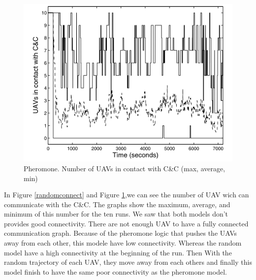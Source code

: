\begin{figure}[h]
\caption{\label{pheromoneconnect}Pheromone. Number of UAVs in contact with C\&C (max, average, min)}
   \includegraphics{../images/pheromone_resultat_connectivite.png}
\end{figure}
In Figure \ref{randomconnect} and Figure \ref{pheromoneconnect},we can see the number of UAV wich can communicate with the C\&C.  The  graphs  show the maximum, average, and minimum of this number for the ten runs.
We saw that both models don't provides good connectivity. There are not enough UAV to have a fully connected communication graph. Because of the pheromone logic that pushes the UAVs away from each other, this modele have low connectivity. Whereas the random model have a high connectivity at the beginning of the run. Then With the random trajectory of each UAV, they move away from each others and finally this model finish to have the same poor connectivity as the pheromone model.
